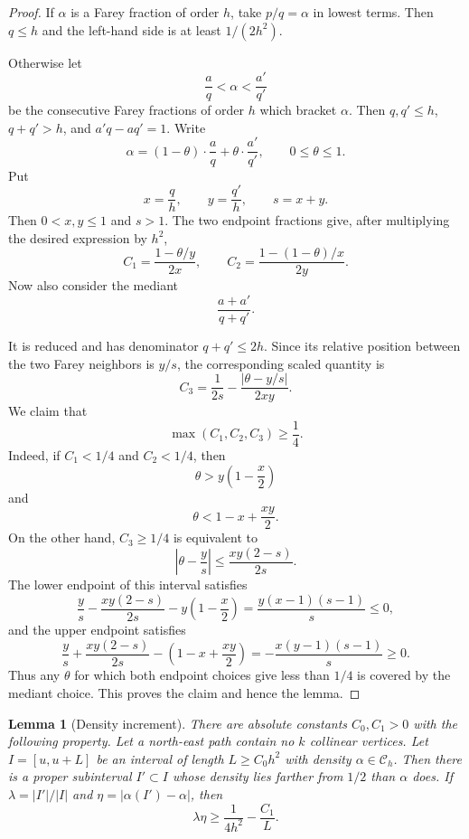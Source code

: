 \documentclass[10pt,a4paper]{amsart}
\newtheorem{lemma}[theorem]{Lemma}
\newcommand{\1}{\mathbf 1}
\begin{document}
\begin{proof}
If $\alpha$ is a Farey fraction of order $h$, take $p/q=\alpha$ in lowest terms. Then $q\le h$ and the left-hand side is at least $1/(2h^2)$.

\bigskip
\noindent
Otherwise let
\[
\frac aq<\alpha<\frac{a'}{q'}
\]
be the consecutive Farey fractions of order $h$ which bracket $\alpha$. Then $q,q'\le h$, $q+q'>h$, and $a'q-aq'=1$. Write
\[
\alpha=(1-\theta)\cdot\frac aq+\theta\cdot\frac{a'}{q'},
\qquad 0\le\theta\le1.
\]
Put
\[
x=\frac qh,
\qquad
 y=\frac{q'}h,
\qquad s=x+y.
\]
Then $0<x,y\le1$ and $s>1$. The two endpoint fractions give, after multiplying the desired expression by $h^2$,
\[
C_1=\frac{1-\theta/y}{2x},
\qquad
C_2=\frac{1-(1-\theta)/x}{2y}.
\]
Now also consider the mediant
\[
\frac{a+a'}{q+q'}.
\]

\smallskip
\noindent
It is reduced and has denominator $q+q'\le2h$. Since its relative position between the two Farey neighbors is $y/s$, the corresponding scaled quantity is
\[
C_3=\frac1{2s}-\frac{|\theta-y/s|}{2xy}.
\]
We claim that
\[
\max(C_1,C_2,C_3)\ge\frac14.
\]
Indeed, if $C_1<1/4$ and $C_2<1/4$, then
\[
\theta>y\left(1-\frac x2\right)
\]
and
\[
\theta<1-x+\frac{xy}{2}.
\]
On the other hand, $C_3\ge1/4$ is equivalent to
\[
\left|\theta-\frac ys\right|\le \frac{xy(2-s)}{2s}.
\]
The lower endpoint of this interval satisfies
\[
\frac ys-\frac{xy(2-s)}{2s}-y\left(1-\frac x2\right)
=\frac{y(x-1)(s-1)}{s}\le0,
\]
and the upper endpoint satisfies
\[
\frac ys+\frac{xy(2-s)}{2s}-\left(1-x+\frac{xy}{2}\right)
=-\frac{x(y-1)(s-1)}{s}\ge0.
\]
Thus any $\theta$ for which both endpoint choices give less than $1/4$ is covered by the mediant choice. This proves the claim and hence the lemma.
\end{proof}

\begin{lemma}[Density increment]\label{lem:density_increment}
There are absolute constants $C_0,C_1>0$ with the following property. Let a north-east path contain no $k$ collinear vertices. Let $I=[u,u+L]$ be an interval of length $L\ge C_0h^2$ with density $\alpha\in\mathcal C_h$. Then there is a proper subinterval $I'\subset I$ whose density lies farther from $1/2$ than $\alpha$ does. If $\lambda=|I'|/|I|$ and $\eta=|\alpha(I')-\alpha|$, then
\[
\lambda\eta\ge \frac1{4h^2}-\frac{C_1}{L}.
\]
\end{lemma}
\end{document}
